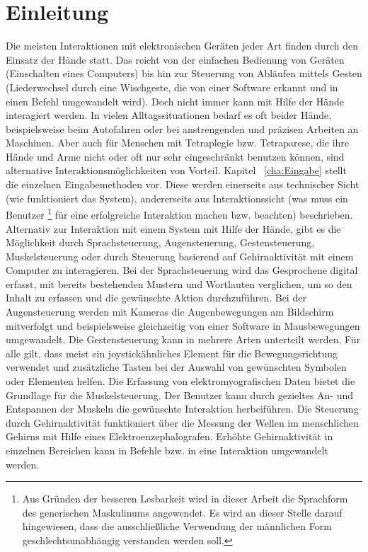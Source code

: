 \chapter{Einleitung}
\label{cha:Einleitung}

Die meisten Interaktionen mit elektronischen Geräten jeder Art finden durch den \mbox{Einsatz} der Hände statt. Das reicht von der einfachen Bedienung von Geräten (\zB Einschalten eines Computers) bis hin zur Steuerung von Abläufen mittels Gesten (\zB Liederwechsel durch eine Wischgeste, die von einer Software erkannt und in einen Befehl umgewandelt wird). Doch nicht immer kann mit Hilfe der Hände interagiert werden. 
In vielen Alltagssituationen bedarf es oft beider Hände, beispielsweise beim Autofahren oder bei anstrengenden und präzisen Arbeiten an Maschinen. Aber auch für Menschen mit \mbox{Tetraplegie} bzw. Tetraparese, die ihre Hände und Arme nicht oder oft nur sehr eingeschränkt benutzen können, sind alternative Interaktionsmöglichkeiten von Vorteil.
\newline \newline
Kapitel ~\ref{cha:Eingabe} stellt die einzelnen Eingabemethoden vor. Diese werden einerseits aus technischer Sicht (wie funktioniert das System), andererseits aus Interaktionssicht (was muss ein Benutzer%
\footnote{Aus Gründen der besseren Lesbarkeit wird in dieser Arbeit die Sprachform des generischen Maskulinums angewendet. Es wird an dieser Stelle darauf hingewiesen, dass die ausschließliche Verwendung der männlichen Form geschlechtsunabhängig verstanden werden soll.}
%
 für eine erfolgreiche Interaktion machen bzw. beachten) beschrieben. \mbox{Alternativ} zur Interaktion mit einem System mit Hilfe der Hände, gibt es die Möglichkeit durch Sprachsteuerung, Augensteuerung, Gestensteuerung, Muskelsteuerung oder durch Steuerung basierend auf Gehirnaktivität mit einem Computer zu interagieren. Bei der Sprachsteuerung wird das Gesprochene digital erfasst, mit bereits bestehenden Mustern und Wortlauten verglichen, um so den Inhalt zu erfassen und die gewünschte Aktion durchzuführen. Bei der Augensteuerung werden mit Kameras die Augenbewegungen am Bildschirm mitverfolgt und beispielsweise gleichzeitig von einer Software in Mausbewegungen umgewandelt. Die Gestensteuerung kann in mehrere Arten unterteilt werden. Für alle gilt, dass meist ein joystickähnliches Element für die Bewegungsrichtung verwendet und zusätzliche Tasten bei der Auswahl von gewünschten Symbolen oder Elementen helfen. Die Erfassung von elektromyografischen Daten bietet die Grundlage für die Muskelsteuerung. Der Benutzer kann durch gezieltes An- und Entspannen der Muskeln die gewünschte Interaktion herbeiführen. Die Steuerung durch Gehirnaktivität funktioniert über die Messung der Wellen im menschlichen Gehirns mit Hilfe eines  Elektroenzephalografen. Erhöhte Gehirnaktivität in einzelnen Bereichen kann in \mbox{Befehle} bzw. in eine Interaktion umgewandelt werden.
